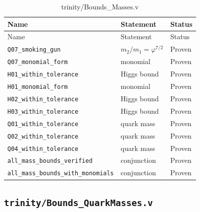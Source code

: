 \begin{longtable}{lll}
\toprule
Name & Statement & Status \\
\midrule
\endfirsthead
\toprule
Name & Statement & Status \\
\midrule
\endhead
\bottomrule
\endfoot
\bottomrule
\caption{trinity/Bounds\_Masses.v}
\endlastfoot
\texttt{Q07\_smoking\_gun} & $m_2/m_1=\varphi^{7/2}$ & Proven \\
\texttt{Q07\_monomial\_form} & monomial & Proven \\
\texttt{H01\_within\_tolerance} & Higgs bound & Proven \\
\texttt{H01\_monomial\_form} & monomial & Proven \\
\texttt{H02\_within\_tolerance} & Higgs bound & Proven \\
\texttt{H03\_within\_tolerance} & Higgs bound & Proven \\
\texttt{Q01\_within\_tolerance} & quark mass & Proven \\
\texttt{Q02\_within\_tolerance} & quark mass & Proven \\
\texttt{Q04\_within\_tolerance} & quark mass & Proven \\
\texttt{all\_mass\_bounds\_verified} & conjunction & Proven \\
\texttt{all\_mass\_bounds\_with\_monomials} & conjunction & Proven \\
\end{longtable}

\subsection{\texttt{trinity/Bounds\_QuarkMasses.v}}
\label{sec:A-coq-quarks}

